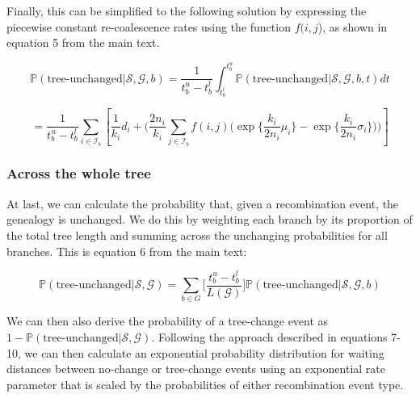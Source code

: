 \documentclass[11pt]{article}
\begin{document}
\noindent Finally, this can be simplified to the following solution by expressing
the piecewise constant re-coalescence rates using the function $f(i,j$), as shown
in equation 5 from the main text.

\begin{equation*}
	\mathbb{P}(\textrm{tree-unchanged} | \mathcal{S},\mathcal{G},b) = 
	\frac{1}{t^u_b-t^l_b} \int_{t_b^l}^{t_b^u} 
	\mathbb{P}(\textrm{tree-unchanged} | \mathcal{S},\mathcal{G},b,t)dt
\end{equation*}

\begin{equation}\tag{5}
	= \frac{1}{t_b^u - t_b^l}
	\sum_{i \in \mathcal{I}_b} 
	\left[\frac{1}{k_i} d_i + 
	\Bigg(
		\frac{2n_i}{k_i} 
		\sum_{j \in \mathcal{I}_b} f(i,j)
		\bigg(
			\exp\bigg\{ \frac{k_i}{2n_i} \mu_i \bigg\} - 
			\exp\bigg\{ \frac{k_i}{2n_i} \sigma_i \bigg\}
		\bigg)
	\Bigg)\right]
\end{equation}


\subsubsection{Across the whole tree}

At last, we can calculate the probability that, given a recombination event, 
the genealogy is unchanged. We do this by weighting each branch by its proportion 
of the total tree length and summing across the unchanging probabilities for 
all branches. This is equation 6 from the main text:

\begin{equation}\tag{6}
	\mathbb{P}(\textrm{tree-unchanged} | \mathcal{S}, \mathcal{G}) = 
	\sum_{b \in G}
	\bigg[
		\frac{t_b^u - t_b^l}{L(\mathcal{G})}
	\bigg]
	\mathbb{P}(\text{tree-unchanged} | \mathcal{S}, \mathcal{G}, b)
\end{equation}

\noindent We can then also derive the probability of a tree-change event
as $1-\mathbb{P}(\textrm{tree-unchanged} | \mathcal{S}, \mathcal{G})$.
Following the approach described in equations 7-10, we can then calculate 
an exponential probability distribution for waiting distances between 
no-change or tree-change events using an exponential rate parameter that is
scaled by the probabilities of either recombination event type.
\end{document}
